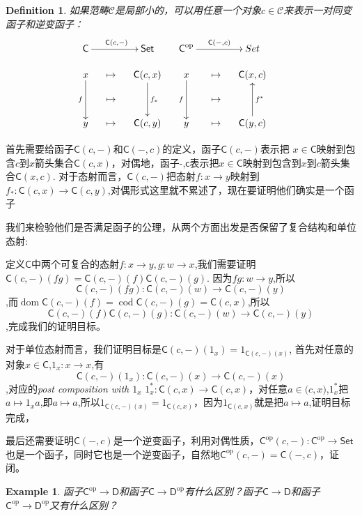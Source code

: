 \documentclass[UTF8,11pt,a4paper]{ctexart}
\newtheorem{example}[theorem]{Example}
\newtheorem{definition}[theorem]{Definition}
\newcommand*{\cat}[1]{\textsf{#1}\xspace}
\newcommand{\Set}{\textsf{Set}\xspace}
\newcommand{\sC}{\mathsf{C}}
\newcommand{\sD}{\mathsf{D}}
\newcommand{\op}{\textrm{op}}
\newcommand*{\xfunc}[4]{{#2}\colon{#3}{#1}{#4}}
\newcommand*{\func}[3]{\xfunc{\to}{#1}{#2}{#3}}
\DeclareMathOperator{\dom}{dom}
\DeclareMathOperator{\cod}{cod}
\begin{document}
\begin{definition}
如果范畴$\mathcal{C}$是局部小的，可以用任意一个对象$c \in \mathcal{C}$来表示一对同变函子和逆变函子：
\[
	\xymatrix@-1pc{
	\cat{C}\ar[rr]^{\cat{C}(c,-)} & & \Set & \cat{C}^\op \ar^{\cat{C}(-,c)}[rr] & & Set \\
	x\ar[dd]_{f} & \mapsto & \cat{C}(c,x)\ar[dd]^{f_*} & x\ar[dd]_{f} & \mapsto & \cat{C}(x,c) \\
	  &\mapsto & & & \mapsto & &\\
	y & \mapsto & \cat{C}(c,y) & y & \mapsto & \cat{C}(y,c)\ar[uu]_{f^*} \\
	}
	\]
\end{definition}

首先需要给函子$\cat{C}(c,-)$和$\cat{C}(-,c)$的定义，函子$\cat{C}(c,-)$表示把
$x \in \cat{C}$映射到包含$c$到$x$箭头集合$\cat{C}(c,x)$，对偶地，函子$\cat{-,c}$表示把$x \in \cat{C}$映射到包含到$x$到$c$箭头集合$\cat{C}(x,c)$. 对于态射而言，$\cat{C}(c,-)$把态射$\func{f}{x}{y}$映射到$\func{f_*}{\cat{C}(c,x)}{\cat{C}(c,y)}$,对偶形式这里就不累述了，现在要证明他们确实是一个函子

我们来检验他们是否满足函子的公理，从两个方面出发是否保留了复合结构和单位态射:

定义$\cat{C}$中两个可复合的态射$\func{f}{x}{y},\func{g}{w}{x}$,我们需要证明$\cat{C}(c,-)(fg)=\cat{C}(c,-)(f)\cat{C}(c,-)(g)$. 因为$\func{fg}{w}{y}$,所以\[\func{\cat{C}(c,-)(fg)}{\cat{C}(c,-)(w)}{\cat{C}(c,-)(y)}\],而$\dom\cat{C}(c,-)(f)=\cod\cat{C}(c,-)(g)=\cat{C}(c,x)$,所以\[\func{\cat{C}(c,-)(f)\cat{C}(c,-)(g)}{\cat{C}(c,-)(w)}{\cat{C}(c,-)(y)}\],完成我们的证明目标。

对于单位态射而言，我们证明目标是$\cat{C}(c,-)(1_x)=1_{\cat{C}(c,-)(x)}$, 首先对任意的对象$x\in\cat{C}$,$\func{1_x}{x}{x}$,有\[\func{\cat{C}(c,-)(1_x)}{\cat{C}(c,-)(x)}{\cat{C}(c,-)(x)}\],对应的\emph{post composition with $1_x$} $\func{1^{*}_{x}}{\cat{C}(c,x)}{\cat{C}(c,x)}$，对任意$a\in\cat(c,x)$,$1^{*}_{x}$把$a\mapsto 1_xa$,即$a \mapsto a$,所以$1_{\cat{C}(c,-)(x)} = 1_{\cat{C}(c,x)}$，因为$1_{\cat{C}(c,x)}$就是把$a \mapsto a$,证明目标完成，

最后还需要证明$\cat{C}(-,c)$是一个逆变函子，利用对偶性质，$\func{\cat{C}^\op(c,-)}{\cat{C}^\op}{\Set}$也是一个函子，同时它也是一个逆变函子，自然地$\cat{C}^\op(c,-) = \cat{C}(-,c)$，证闭。

\begin{example}
函子$\sC^{\op}\to \sD$和函子$\sC\to \sD^{\op}$有什么区别？函子$\sC\to\sD$和函子$\sC^{\op}\to \sD^{\op}$又有什么区别？
\end{example}
\end{document}
